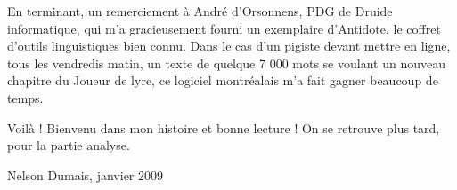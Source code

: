 
En terminant, un remerciement à André d’Orsonnens, PDG de Druide informatique, qui m’a gracieusement fourni un exemplaire d’Antidote, le coffret d’outils linguistiques bien connu. Dans le cas d’un pigiste devant mettre en ligne, tous les vendredis matin, un texte de quelque 7 000 mots se voulant un nouveau chapitre du Joueur de lyre, ce logiciel montréalais m’a fait gagner beaucoup de temps.

Voilà ! Bienvenu dans mon histoire et bonne lecture ! On se retrouve plus tard, pour la partie analyse.

Nelson Dumais, janvier 2009

